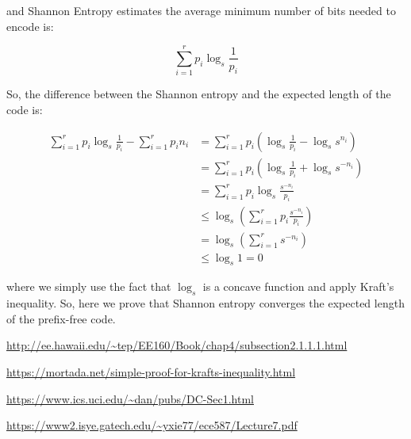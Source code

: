 \documentclass[11pt]{article}
\begin{document}
and Shannon Entropy estimates the average minimum number of bits needed to encode is:


\begin{equation}
\sum_{i=1}^r p_{i}\log_{s}\frac{1}{p_{i}}
\end{equation}

So, the difference between the Shannon entropy and the expected length of the code is:

\begin{equation} \label{eq1}
\begin{split}
\sum_{i=1}^r p_{i}\log_{s}\frac{1}{p_{i}} - \sum_{i=1}^r p_{i}n_{i} &= \sum_{i=1}^r p_{i}(\log_{s}\frac{1}{p_{i}} - \log_{s}s^{n_{i}}) \\
 & =\sum_{i=1}^r p_{i}(\log_{s}\frac{1}{p_{i}} + \log_{s}s^{-n_{i}}) \\
 & =\sum_{i=1}^r p_{i}\log_{s} \frac{s^{-n_{i}}}{p_{i}} \\
 & \leq \log_{s}(\sum_{i=1}^r p_{i} \frac{s^{-n_{i}}}{p_{i}}) \\
 & = \log_{s} (\sum_{i=1}^r s^{-n_{i}}) \\
 & \leq \log_{s} 1 = 0
\end{split}
\end{equation}

where we simply use the fact that $\log_{s}$ is a concave function and apply Kraft's inequality. So, here we prove that Shannon entropy converges the expected length of the prefix-free code.

\begin{thebibliography}{99}

\url{http://ee.hawaii.edu/~tep/EE160/Book/chap4/subsection2.1.1.1.html}

\url{https://mortada.net/simple-proof-for-krafts-inequality.html}

\url{https://www.ics.uci.edu/~dan/pubs/DC-Sec1.html}

\url{https://www2.isye.gatech.edu/~yxie77/ece587/Lecture7.pdf}

\end{thebibliography}
\end{document}
